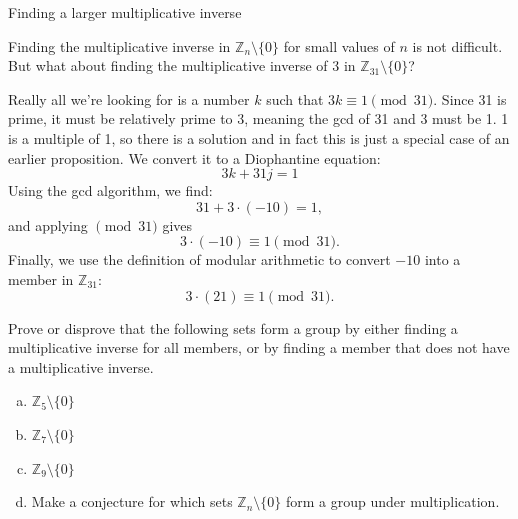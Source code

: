 \begin{example}{Finding a larger multiplicative inverse}


Finding the multiplicative inverse in $\mathbb{Z}_n \setminus \{0\}$ for small values of $n$  is not difficult.  But what about finding the multiplicative inverse of 3 in $\mathbb{Z}_{31}\setminus \{0\}$?  

% 





Really all we're looking for is a number $k$ such that $3k \equiv 1 \pmod {31}$.  Since 31 is prime, it must be relatively prime to 3, meaning the gcd of 31 and 3 must be 1.  1 is a multiple of 1, so there is a solution and in fact this is just a special case of an earlier proposition.  We convert it to a Diophantine equation:
\[3k + 31j = 1\]
Using the gcd algorithm, we find:
\[31+3\cdot(-10) = 1,\]
and applying $\pmod{31}$ gives
\[3\cdot(-10) \equiv 1 \pmod{31}.\]
Finally, we use the definition of modular arithmetic to convert $-10$ into a member in $\mathbb{Z}_{31}$:
\[3\cdot(21) \equiv 1 \pmod{31}.\] 
\end{example}


\begin{exercise}{90}
Prove or disprove that the following sets form a group by either finding a multiplicative inverse for all members, or by finding a member that does not have a multiplicative inverse.
\begin{enumerate}[(a)]
\item
$\mathbb{Z}_5\setminus \{0\}$
\item
$\mathbb{Z}_7\setminus \{0\}$
\item
$\mathbb{Z}_9\setminus \{0\}$
\item
Make a conjecture for which sets $\mathbb{Z}_n \setminus \{0\}$ form a group under multiplication.
\end{enumerate}
\end{exercise}

